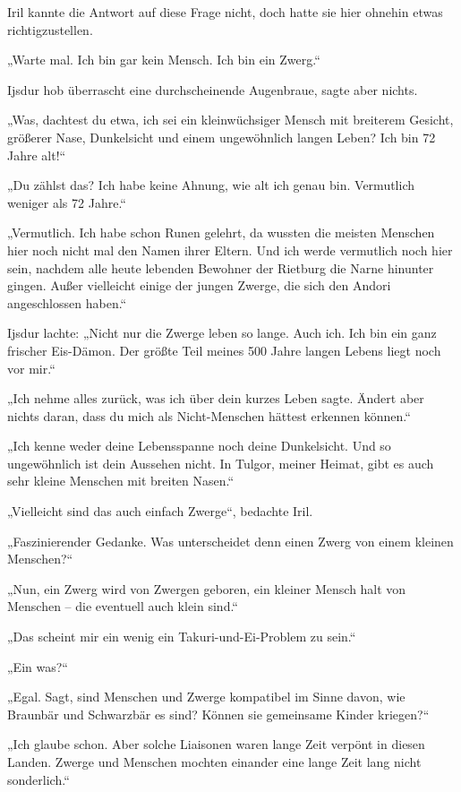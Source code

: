 Iril kannte die Antwort auf diese Frage nicht, doch hatte sie hier ohnehin etwas richtigzustellen.

„Warte mal. Ich bin gar kein Mensch. Ich bin ein Zwerg.“

Ijsdur hob überrascht eine durchscheinende Augenbraue, sagte aber nichts.

„Was, dachtest du etwa, ich sei ein kleinwüchsiger Mensch mit breiterem Gesicht, größerer Nase, Dunkelsicht und einem ungewöhnlich langen Leben? Ich bin 72 Jahre alt!“

„Du zählst das? Ich habe keine Ahnung, wie alt ich genau bin. Vermutlich weniger als 72 Jahre.“

„Vermutlich. Ich habe schon Runen gelehrt, da wussten die meisten Menschen hier noch nicht mal den Namen ihrer Eltern. Und ich werde vermutlich noch hier sein, nachdem alle heute lebenden Bewohner der Rietburg die Narne hinunter gingen. Außer vielleicht einige der jungen Zwerge, die sich den Andori angeschlossen haben.“

Ijsdur lachte: „Nicht nur die Zwerge leben so lange. Auch ich. Ich bin ein ganz frischer Eis-Dämon. Der größte Teil meines 500 Jahre langen Lebens liegt noch vor mir.“

„Ich nehme alles zurück, was ich über dein kurzes Leben sagte. Ändert aber nichts daran, dass du mich als Nicht-Menschen hättest erkennen können.“

„Ich kenne weder deine Lebensspanne noch deine Dunkelsicht. Und so ungewöhnlich ist dein Aussehen nicht. In Tulgor, meiner Heimat, gibt es auch sehr kleine Menschen mit breiten Nasen.“

„Vielleicht sind das auch einfach Zwerge“, bedachte Iril.

„Faszinierender Gedanke. Was unterscheidet denn einen Zwerg von einem kleinen Menschen?“

„Nun, ein Zwerg wird von Zwergen geboren, ein kleiner Mensch halt von Menschen – die eventuell auch klein sind.“

„Das scheint mir ein wenig ein Takuri-und-Ei-Problem zu sein.“

„Ein was?“

„Egal. Sagt, sind Menschen und Zwerge kompatibel im Sinne davon, wie Braunbär und Schwarzbär es sind? Können sie gemeinsame Kinder kriegen?“

„Ich glaube schon. Aber solche Liaisonen waren lange Zeit verpönt in diesen Landen. Zwerge und Menschen mochten einander eine lange Zeit lang nicht sonderlich.“

